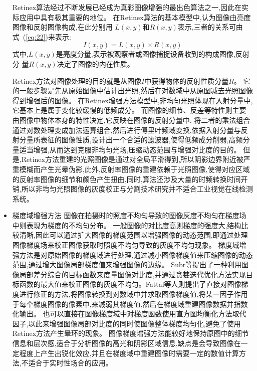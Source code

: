 \documentclass{amsart}
\begin{document}
\begin{itemize}
  Retinex算法经过不断发展已经成为真彩图像增强的最出色算法之一,因此在实际应用中具有极其重要的地位。
  在Retinex算法的基本模型中,认为图像由亮度图像和反射图像构成,在此分别用
  $L(x,y)$和$R(x,y)$表示,三者的关系可由式~(\ref{eq:22})来表示:
  \begin{equation}
    \label{eq:22}
I(x,y)=L(x,y)\times R(x,y)
  \end{equation}
式中,$L(x,y)$是亮度分量,表示被观察者或图像捕捉设备收到的构成图像,反射分
量$R(x,y)$决定了图像的内在性质。

Retinex方法对图像处理的目的就是从图像$I$中获得物体的反射性质分量$R$。
它的一般步骤是先从原始图像中估计出光照,然后在对数域中从原图减去光照图像得到增强后的图像。
在Retinex增强方法模型中,非均匀光照体现在入射分量中,它基本上是属于变化较缓慢的低频成分。
而图像的细节、反差等特性则主要由图像中物体本身的特性决定,它反映在图像的反射分量中.
将二者的乘法组合通过对数处理变成加法运算组合,然后进行傅里叶频域变换,依据入射分量与反射分量所表征的图像性质,设计出一个合适的滤波器,使得低频成分削弱,高频分量适当增强,从而达到克服非均匀光场,压缩动态范围与增强对比度的目的。
但是,Retinex方法重建的光照图像是通过对全局平滑得到,所以阴影边界附近被严重模糊而产生光晕伪影,此外,反射率图像的重建依赖于光照图像,使得对应区域的反射率图像的细节和颜色产生扭曲,同时,算法还涉及大量的时频转换时间开销,所以非均匀光照图像的灰度校正与分割技术研究并不适合工业视觉在线检测系统。
\item 梯度域增强方法
  图像在拍摄时的照度不均匀导致的图像灰度不均匀在梯度场中则表现为梯度的不均匀分布。
  一般图像的对比度高则梯度的强度大,结构比较清晰,因此可以通过扩大图像的梯度范围以增强图像的动态范围,即通过处理图像梯度场来校正图像获取时照度不均匀导致的灰度不均匀现象。
  梯度域增强方法是对原始图像的梯度域进行处理,通过减小图像梯度值来压缩图像的动态范围,通过增大图像局部梯度值来增强图像的边缘。
  Subr等提出了一种利用图像局部差分综合的目标函数来度量图像对比度,并通过贪婪迭代优化方法实现目标函数的最大值来校正图像的灰度不均匀。Fattal等人则提出了直接对图像梯度进行修正的方法,将图像转换到对数域中并求取图像梯度值,将某一因子作用于每个梯度图像的像素中,来减弱其梯度值,然后在梯度域重建图像数据并指数化输出。
  也可以直接在图像梯度域中对梯度函数使用直方图均衡化方法取代因子,以此来增强图像局部对比度的同时使图像整体梯度均匀化,避免了使用Retinex方法产生晕环的现象。
图像梯度增强方法能较好地保持原图中的细节信息和层次感,适合于分析图像的高光和阴影区域信息,缺点是会导致图像在一定程度上产生出锐化效应,并且在梯度域中重建图像时需要一定的数值计算方法,不适合于实时性场合的应用。


\end{itemize}
\end{document}
